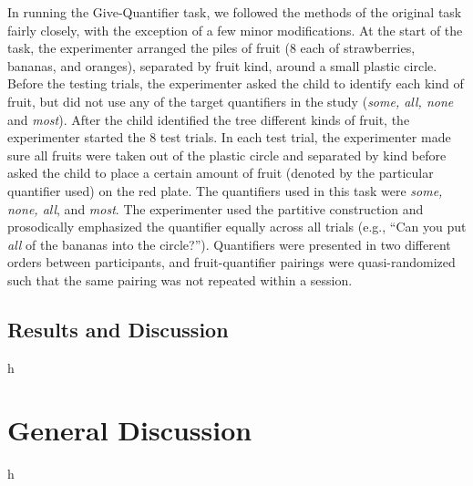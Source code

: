 \documentclass[man]{apa2}
\begin{document}
In running the Give-Quantifier task, we followed the methods of the original task fairly closely, with the exception of a few minor modifications. At the start of the task, the experimenter arranged the piles of fruit (8 each of strawberries, bananas, and oranges), separated by fruit kind, around a small plastic circle. Before the testing trials, the experimenter asked the child to identify each kind of fruit, but did not use any of the target quantifiers in the study (\textit{some, all, none} and \textit{most}). After the child identified the tree different kinds of fruit, the experimenter started the 8 test trials. In each test trial, the experimenter made sure all fruits were taken out of the plastic circle and separated by kind before asked the child to place a certain amount of fruit (denoted by the particular quantifier used) on the red plate. The quantifiers used in this task were \textit{some, none, all}, and \textit{most}. The experimenter used the partitive construction and prosodically emphasized the quantifier equally across all trials (e.g., ``Can you put \textit{all} of the bananas into the circle?''). Quantifiers were presented in two different orders between participants, and fruit-quantifier pairings were quasi-randomized such that the same pairing was not repeated within a session. 



\subsection{Results and Discussion}
h

\section{General Discussion}

h







\newpage
\theappendix 

\section{}
\end{document}
